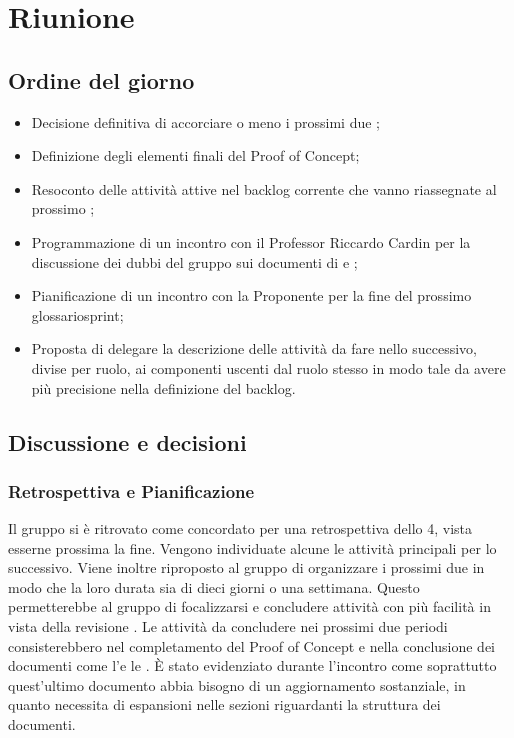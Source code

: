 \section{Riunione}
\subsection{Ordine del giorno}
\begin{itemize}
	\item Decisione definitiva di accorciare o meno i prossimi  due ;
	\item Definizione degli elementi finali del Proof of Concept;
	\item Resoconto delle attività attive nel backlog corrente che vanno riassegnate al prossimo ;
	\item Programmazione di un incontro con il Professor Riccardo Cardin per la discussione dei dubbi del gruppo sui documenti di \AdR e \PdQ;
	\item Pianificazione di un incontro con la Proponente per la fine del prossimo glossario{sprint};
	\item Proposta di delegare la descrizione delle attività da fare nello  successivo, divise per ruolo, ai componenti uscenti dal ruolo stesso in modo tale da avere più precisione nella definizione del backlog.
\end{itemize}

\subsection{Discussione e decisioni}
\subsubsection{Retrospettiva e Pianificazione}
\par Il gruppo si è ritrovato come concordato per una retrospettiva dello  4, vista esserne prossima la fine. Vengono individuate alcune le attività principali per lo  successivo. 
Viene inoltre riproposto al gruppo di organizzare i prossimi due  in modo che la loro durata sia di dieci giorni o una settimana. 
Questo permetterebbe al gruppo di focalizzarsi e concludere attività con più facilità in vista della revisione \RTB.
Le attività da concludere nei prossimi due periodi consisterebbero nel completamento del Proof of Concept e nella conclusione dei documenti come l'\AdR e le \NdP.
È stato evidenziato durante l'incontro come soprattutto quest'ultimo documento abbia bisogno di un aggiornamento sostanziale, in quanto necessita di espansioni nelle sezioni riguardanti la struttura dei documenti.

